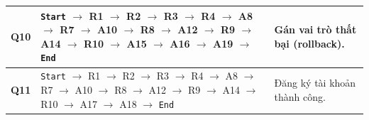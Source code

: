 \documentclass[11pt,a4paper]{article}
\begin{document}
\begin{longtable}{|C{1.3cm}|L{8.3cm}|L{6.2cm}|}
\textbf{Q10} & \texttt{Start} $\rightarrow$ R1 $\rightarrow$ R2 $\rightarrow$ R3 $\rightarrow$ R4 $\rightarrow$ A8 $\rightarrow$ R7 $\rightarrow$ A10 $\rightarrow$ R8 $\rightarrow$ A12 $\rightarrow$ R9 $\rightarrow$ A14 $\rightarrow$ R10 $\rightarrow$ A15 $\rightarrow$ A16 $\rightarrow$ A19 $\rightarrow$ \texttt{End} & Gán vai trò thất bại (rollback). \\ \hline
\textbf{Q11} & \texttt{Start} $\rightarrow$ R1 $\rightarrow$ R2 $\rightarrow$ R3 $\rightarrow$ R4 $\rightarrow$ A8 $\rightarrow$ R7 $\rightarrow$ A10 $\rightarrow$ R8 $\rightarrow$ A12 $\rightarrow$ R9 $\rightarrow$ A14 $\rightarrow$ R10 $\rightarrow$ A17 $\rightarrow$ A18 $\rightarrow$ \texttt{End} & Đăng ký tài khoản thành công. \\ \hline
\end{longtable}
\end{document}
